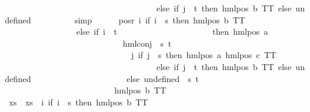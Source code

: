 \begin{isabellebody}
\ \ \ \ \ \ \ \ \ \ \ \ \ \ \ \ \ \ \ \ \ \ \ \ \ \ \ \ \ \ \ \ \ \ \ \ else\ if\ j\ {\isacharequal}{\kern0pt}\ t\ then\ hml{\isacharunderscore}{\kern0pt}pos\ b\ TT\ else\ undefined{\isacharparenright}{\kern0pt}{\isacharparenright}{\kern0pt}{\isacharparenright}{\kern0pt}\ {\isacharequal}{\kern0pt}\ {}{\isachardoublequoteclose}\isanewline
\ \ \ \ \ \ \isamarkupfalse%
\ simp\isanewline
\ \ \ \ \isamarkupfalse%
\ {\isachardoublequoteopen}{\isacharparenleft}{\kern0pt}pos{\isacharunderscore}{\kern0pt}r\ {\isacharparenleft}{\kern0pt}{\isacharparenleft}{\kern0pt}{\isasymlambda}i{\isachardot}{\kern0pt}\ if\ i\ {\isacharequal}{\kern0pt}\ s\ then\ hml{\isacharunderscore}{\kern0pt}pos\ b\ TT\isanewline
\ \ \ \ \ \ \ \ \ \ \ \ \ \ \ \ \ else\ if\ i\ {\isacharequal}{\kern0pt}\ t\isanewline
\ \ \ \ \ \ \ \ \ \ \ \ \ \ \ \ \ \ \ \ \ \ then\ hml{\isacharunderscore}{\kern0pt}pos\ a\isanewline
\ \ \ \ \ \ \ \ \ \ \ \ \ \ \ \ \ \ \ \ \ \ \ \ \ \ \ \ {\isacharparenleft}{\kern0pt}hml{\isacharunderscore}{\kern0pt}conj\ {\isacharbraceleft}{\kern0pt}{\isacharbraceright}{\kern0pt}\ {\isacharbraceleft}{\kern0pt}s{\isacharcomma}{\kern0pt}\ t{\isacharbraceright}{\kern0pt}\isanewline
\ \ \ \ \ \ \ \ \ \ \ \ \ \ \ \ \ \ \ \ \ \ \ \ \ \ \ \ \ \ {\isacharparenleft}{\kern0pt}{\isasymlambda}j{\isachardot}{\kern0pt}\ if\ j\ {\isacharequal}{\kern0pt}\ s\ then\ hml{\isacharunderscore}{\kern0pt}pos\ a\ {\isacharparenleft}{\kern0pt}hml{\isacharunderscore}{\kern0pt}pos\ c\ TT{\isacharparenright}{\kern0pt}\isanewline
\ \ \ \ \ \ \ \ \ \ \ \ \ \ \ \ \ \ \ \ \ \ \ \ \ \ \ \ \ \ \ \ \ \ \ \ else\ if\ j\ {\isacharequal}{\kern0pt}\ t\ then\ hml{\isacharunderscore}{\kern0pt}pos\ b\ TT\ else\ undefined{\isacharparenright}{\kern0pt}{\isacharparenright}{\kern0pt}\isanewline
\ \ \ \ \ \ \ \ \ \ \ \ \ \ \ \ \ \ \ \ \ \ else\ undefined{\isacharparenright}{\kern0pt}\ {\isacharbackquote}{\kern0pt}\ {\isacharbraceleft}{\kern0pt}s{\isacharcomma}{\kern0pt}\ t{\isacharbraceright}{\kern0pt}{\isacharparenright}{\kern0pt}{\isacharparenright}{\kern0pt}\ {\isacharequal}{\kern0pt}\ \isanewline
\ \ \ \ \ \ \ \ \ \ \ \ \ \ \ \ \ \ \ \ \ \ \ \ \ \ {\isacharbraceleft}{\kern0pt}hml{\isacharunderscore}{\kern0pt}pos\ b\ TT{\isacharbraceright}{\kern0pt}{\isachardoublequoteclose}\isanewline
\ \ \ \ \isamarkupfalse%
{\isacharminus}{\kern0pt}\isanewline
\ \ \ \ \ \ \isamarkupfalse%
\ xs\ \ {\isachardoublequoteopen}xs\ {\isasymequiv}\ {\isacharparenleft}{\kern0pt}{\isacharparenleft}{\kern0pt}{\isasymlambda}i{\isachardot}{\kern0pt}\ if\ i\ {\isacharequal}{\kern0pt}\ s\ then\ hml{\isacharunderscore}{\kern0pt}pos\ b\ TT\isanewline

\end{isabellebody}

